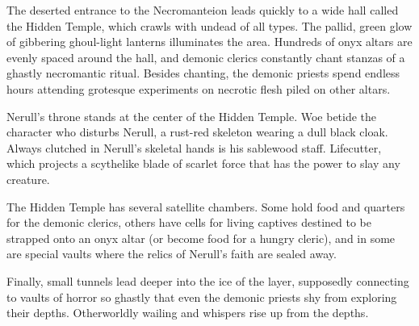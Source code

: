 The deserted entrance to the Necromanteion leads quickly to a wide hall called the Hidden Temple, which crawls with undead of all types. The pallid, green glow of gibbering ghoul-light lanterns illuminates the area. Hundreds of onyx altars are evenly spaced around the hall, and demonic clerics constantly chant stanzas of a ghastly necromantic ritual. Besides chanting, the demonic priests spend endless hours attending grotesque experiments on necrotic flesh piled on other altars.

Nerull's throne stands at the center of the Hidden Temple. Woe betide the character who disturbs Nerull, a rust-red skeleton wearing a dull black cloak. Always clutched in Nerull's skeletal hands is his sablewood staff. Lifecutter, which projects a scythelike blade of scarlet force that has the power to slay any creature.

The Hidden Temple has several satellite chambers. Some hold food and quarters for the demonic clerics, others have cells for living captives destined to be strapped onto an onyx altar (or become food for a hungry cleric), and in some are special vaults where the relics of Nerull's faith are sealed away.

Finally, small tunnels lead deeper into the ice of the layer, supposedly connecting to vaults of horror so ghastly that even the demonic priests shy from exploring their depths. Otherworldly wailing and whispers rise up from the depths.
